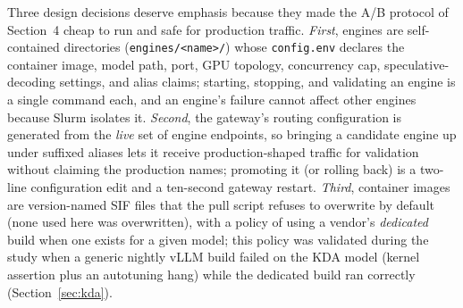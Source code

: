\documentclass[11pt]{article}
\begin{document}
Three design decisions deserve emphasis because they made the A/B protocol of Section~4 cheap to run and safe for production traffic. \emph{First}, engines are self-contained directories (\texttt{engines/<name>/}) whose \texttt{config.env} declares the container image, model path, port, GPU topology, concurrency cap, speculative-decoding settings, and alias claims; starting, stopping, and validating an engine is a single command each, and an engine's failure cannot affect other engines because Slurm isolates it. \emph{Second}, the gateway's routing configuration is generated from the \emph{live} set of engine endpoints, so bringing a candidate engine up under suffixed aliases lets it receive production-shaped traffic for validation without claiming the production names; promoting it (or rolling back) is a two-line configuration edit and a ten-second gateway restart. \emph{Third}, container images are version-named SIF files that the pull script refuses to overwrite by default (none used here was overwritten), with a policy of using a vendor's \emph{dedicated} build when one exists for a given model; this policy was validated during the study when a generic nightly vLLM build failed on the KDA model (kernel assertion plus an autotuning hang) while the dedicated build ran correctly (Section~\ref{sec:kda}).
\end{document}
